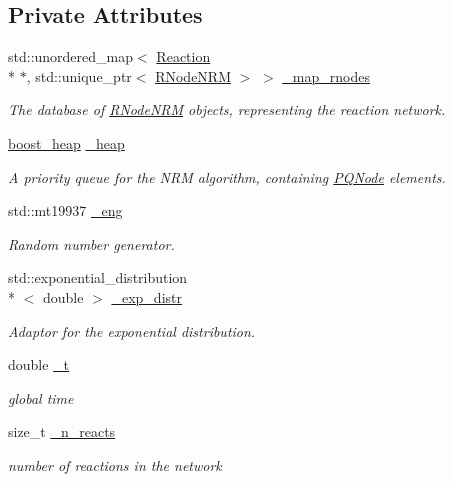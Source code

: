 \subsection*{Private Attributes}
\begin{DoxyCompactItemize}
\item 
std\-::unordered\-\_\-map$<$ \hyperlink{classchem_1_1Reaction}{Reaction} \\*
$\ast$, std\-::unique\-\_\-ptr$<$ \hyperlink{classchem_1_1RNodeNRM}{R\-Node\-N\-R\-M} $>$ $>$ \hyperlink{classchem_1_1ChemNRMImpl_a6b86101b0c90389e5f027cc4bffccfd3}{\-\_\-map\-\_\-rnodes}
\begin{DoxyCompactList}\small\item\em The database of \hyperlink{classchem_1_1RNodeNRM}{R\-Node\-N\-R\-M} objects, representing the reaction network. \end{DoxyCompactList}\item 
\hyperlink{namespacechem_aacd1d2bb93e0bb1b1af9bb1fbb5133ca}{boost\-\_\-heap} \hyperlink{classchem_1_1ChemNRMImpl_af2063c9b768c13ac541886947c567c1f}{\-\_\-heap}
\begin{DoxyCompactList}\small\item\em A priority queue for the N\-R\-M algorithm, containing \hyperlink{classchem_1_1PQNode}{P\-Q\-Node} elements. \end{DoxyCompactList}\item 
std\-::mt19937 \hyperlink{classchem_1_1ChemNRMImpl_ad0dce1073a3c37dd21c6523a81dd18e6}{\-\_\-eng}
\begin{DoxyCompactList}\small\item\em Random number generator. \end{DoxyCompactList}\item 
std\-::exponential\-\_\-distribution\\*
$<$ double $>$ \hyperlink{classchem_1_1ChemNRMImpl_ac817f5c731ea5522ea661a9e6c978d6a}{\-\_\-exp\-\_\-distr}
\begin{DoxyCompactList}\small\item\em Adaptor for the exponential distribution. \end{DoxyCompactList}\item 
double \hyperlink{classchem_1_1ChemNRMImpl_a1b14f424d72d3c5b0aafe31d7b7c4f82}{\-\_\-t}
\begin{DoxyCompactList}\small\item\em global time \end{DoxyCompactList}\item 
size\-\_\-t \hyperlink{classchem_1_1ChemNRMImpl_a7e53992b28e926d1a19f3fd7dea171c3}{\-\_\-n\-\_\-reacts}
\begin{DoxyCompactList}\small\item\em number of reactions in the network \end{DoxyCompactList}\end{DoxyCompactItemize}


